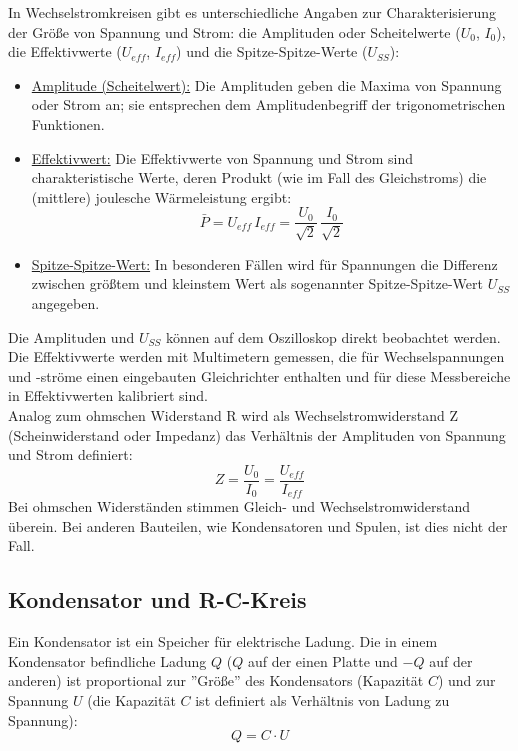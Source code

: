 \noindent
In Wechselstromkreisen gibt es unterschiedliche Angaben zur Charakterisierung der Größe von Spannung und Strom: die Amplituden oder Scheitelwerte ($U_0$, $I_0$), die Effektivwerte ($U_{eff}$, $I_{eff}$) und die Spitze-Spitze-Werte ($U_{SS}$):
\begin{itemize}
 \item \underline{Amplitude (Scheitelwert):} Die Amplituden geben die Maxima von Spannung oder Strom an; sie entsprechen dem Amplitudenbegriff der trigonometrischen Funktionen.
 \item \underline{Effektivwert:} Die Effektivwerte von Spannung und Strom sind charakteristische Werte, deren Produkt (wie im Fall des Gleichstroms) die (mittlere) joulesche Wärmeleistung ergibt:
  \begin{equation}
   \bar{P} = U_{eff}\, I_{eff} = \frac{U_0}{\sqrt{2}}\,\frac{I_0}{\sqrt{2}}
  \end{equation}
 \item \underline{Spitze-Spitze-Wert:} In besonderen Fällen wird für Spannungen die Differenz zwischen größtem und kleinstem Wert als sogenannter Spitze-Spitze-Wert $U_{SS}$ angegeben.
\end{itemize}

Die Amplituden und $U_{SS}$ können auf dem Oszilloskop direkt beobachtet werden. Die Effektivwerte werden mit Multimetern gemessen, die für Wechselspannungen und -ströme einen eingebauten Gleichrichter enthalten und für diese Messbereiche in Effektivwerten kalibriert sind.\\

Analog zum ohmschen Widerstand R wird als Wechselstromwiderstand Z (Scheinwiderstand oder Impedanz) das Verhältnis der Amplituden von Spannung und Strom definiert:
\begin{equation}
 Z = \frac{U_0}{I_0} = \frac{U_{eff}}{I_{eff}}
 \label{eq:Z}
\end{equation}
Bei ohmschen Widerständen stimmen Gleich- und Wechselstromwiderstand überein. Bei anderen Bauteilen, wie Kondensatoren und Spulen, ist dies nicht der Fall.

\subsection{Kondensator und R-C-Kreis}

Ein Kondensator ist ein Speicher für elektrische Ladung. Die in einem Kondensator befindliche Ladung $Q$ ($Q$ auf der einen Platte und $-Q$ auf der anderen) ist proportional zur ''Größe'' des Kondensators (Kapazität $C$) und zur Spannung $U$ (die Kapazität $C$ ist definiert als Verhältnis von Ladung zu Spannung):
\begin{equation}
 Q = C\cdot U
 \label{eq:Q}
\end{equation}

